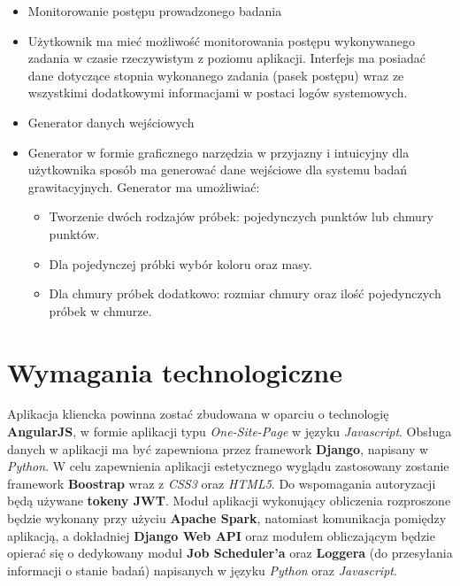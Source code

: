 \documentclass[a4paper,onecolumn,oneside,12pt]{memoir}
\begin{document}
{\begin{itemize}\bfseries
\item Monitorowanie postępu prowadzonego badania
\end{itemize}
\begin{itemize}
\item[] Użytkownik ma mieć możliwość monitorowania postępu wykonywanego zadania w czasie rzeczywistym z poziomu aplikacji. Interfejs ma posiadać dane dotyczące stopnia wykonanego zadania (pasek postępu) wraz ze wszystkimi dodatkowymi informacjami w postaci logów systemowych.
\end{itemize}


\begin{itemize}\bfseries
\item Generator danych wejściowych
\end{itemize}
\begin{itemize}
\item[] Generator w formie graficznego narzędzia w przyjazny i intuicyjny dla użytkownika sposób ma generować dane wejściowe dla systemu badań grawitacyjnych. Generator ma umożliwiać:
\begin{itemize}
\item Tworzenie dwóch rodzajów próbek: pojedynczych punktów lub chmury punktów.
\item Dla pojedynczej próbki wybór koloru oraz masy.
\item Dla chmury próbek dodatkowo: rozmiar chmury oraz ilość pojedynczych próbek w chmurze.

\end{itemize}
\end{itemize}

\section{Wymagania technologiczne}

	Aplikacja kliencka powinna zostać zbudowana w oparciu o technologię \textbf{AngularJS}, w formie aplikacji typu \textit{One-Site-Page} w języku \textit{Javascript}. Obsługa danych w aplikacji ma być zapewniona przez framework \textbf{Django}, napisany w \textit{Python}. W celu zapewnienia aplikacji estetycznego wyglądu zastosowany zostanie framework \textbf{Boostrap} wraz z \textit{CSS3} oraz \textit{HTML5}. Do wspomagania autoryzacji będą używane \textbf{tokeny JWT}. Moduł aplikacji wykonujący obliczenia rozproszone będzie wykonany przy użyciu \textbf{Apache Spark}, natomiast komunikacja pomiędzy aplikacją, a dokładniej \textbf{Django Web API} oraz modułem obliczającym będzie opierać się o dedykowany moduł \textbf{Job Scheduler'a} oraz \textbf{Loggera} (do przesyłania informacji o stanie badań) napisanych w języku \textit{Python} oraz \textit{Javascript}.




}
\end{document}
